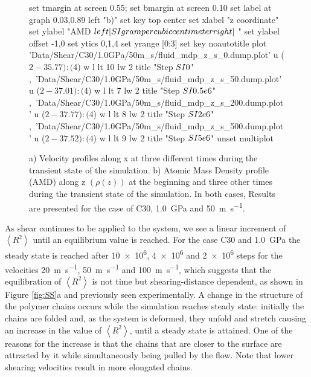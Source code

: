 \documentclass[aps,prb,reprint,superscriptaddress, a4paper]{revtex4-1}
\begin{document}
\begin{figure}
\begin{center}
\begin{gnuplot}[terminal=pdf, terminaloptions={size \SERFigwidth cm, \SERFigheight cm color solid}]
			set tmargin at screen 0.55; set bmargin at screen 0.10
			set label at graph 0.03,0.89 left "b)"
			set key top center
			set xlabel "z coordinate"  
			set ylabel "AMD $\\left[ \\SI{}{\\gram\\per\\cubic\\centi\\meter} \\right]$ "
			set ylabel offset -1,0
			set ytics 0,1,4
			set yrange [0:3]
			set key noautotitle
			plot  	'Data/Shear/C30/1.0GPa/50m_s/fluid_mdp_z_s_0.dump.plot' u ($2-35.77):($4) w l  lt 10 lw 2   title "Step $\\SI{0}{}$" ,\
				  	'Data/Shear/C30/1.0GPa/50m_s/fluid_mdp_z_s_50.dump.plot' u ($2-37.01):($4) w l  lt 7 lw 2   title "Step $\\SI{0.5e6}{}$" ,\
				  	'Data/Shear/C30/1.0GPa/50m_s/fluid_mdp_z_s_200.dump.plot' u ($2-37.77):($4) w l  lt 8 lw 2   title "Step $\\SI{2e6}{}$" ,\
				  	'Data/Shear/C30/1.0GPa/50m_s/fluid_mdp_z_s_500.dump.plot' u ($2-37.52):($4) w l  lt 9  lw 2  title "Step $\\SI{5e6}{}$" 
			unset multiplot
		\end{gnuplot}
		\caption{a) Velocity profiles along x at three different times during the transient state of the simulation. b) Atomic Mass Density profile (AMD) along z $\left(\rho \left(z\right) \right)$ at the beginning and  three other times during the transient state of the simulation. In both cases, Results are presented for the case of  C30,  \SI{1.0}{\giga\pascal} and  \SI{50}{\meter\per\second}.}
		\label{fig:VelProf_MDP}
	\end{center}
 \end{figure}

As shear continues to be applied to the system,  we see a linear increment of $\left< R^2 \right> $ until an equilibrium value is reached. For the case C30 and \SI{1.0}{\giga\pascal}  the steady state is reached after \SI{10e6}{}, \SI{4e6}{} and \SI{2e6}{} steps for the velocities  \SI{20}{\meter\per\second}, \SI{50}{\meter\per\second} and \SI{100}{\meter\per\second}, which suggests that the equilibration of  $\left< R^2 \right> $ is not time but shearing-distance dependent, as shown in Figure \ref{fig:SS}a and previously seen experimentally\cite{Drummond2000}.   A change in the structure of the polymer chains occurs while the simulation reaches steady state: initially the  chains are folded and, as the system is deformed, they unfold and stretch causing an increase in the value of  $\left< R^2 \right> $, until a steady state is attained. One of the reasons  for the increase  is that the chains that are closer to the surface are attracted by it while simultaneously being pulled by the flow. Note that lower shearing velocities result in more elongated chains.
\end{document}
